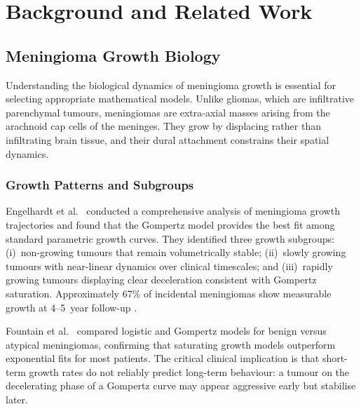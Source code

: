 \section{Background and Related Work}
\label{sec:background}

\subsection{Meningioma Growth Biology}
\label{sec:bg:growth_biology}

Understanding the biological dynamics of meningioma growth is essential for
selecting appropriate mathematical models. Unlike gliomas, which are
infiltrative parenchymal tumours, meningiomas are extra-axial masses arising
from the arachnoid cap cells of the meninges. They grow by displacing rather
than infiltrating brain tissue, and their dural attachment constrains their
spatial dynamics.

\subsubsection{Growth Patterns and Subgroups}

Engelhardt et al.\ \cite{engelhardt2023gompertz} conducted a comprehensive
analysis of meningioma growth trajectories and found that the Gompertz model
provides the best fit among standard parametric growth curves. They identified
three growth subgroups: (i)~non-growing tumours that remain volumetrically
stable; (ii)~slowly growing tumours with near-linear dynamics over clinical
timescales; and (iii)~rapidly growing tumours displaying clear deceleration
consistent with Gompertz saturation. Approximately 67\% of incidental
meningiomas show measurable growth at 4--5~year follow-up
\cite{hashimoto2012natural}.

Fountain et al.\ \cite{fountain2017growth} compared logistic and Gompertz
models for benign versus atypical meningiomas, confirming that saturating
growth models outperform exponential fits for most patients. The critical
clinical implication is that short-term growth rates do not reliably predict
long-term behaviour: a tumour on the decelerating phase of a Gompertz curve
may appear aggressive early but stabilise later.

